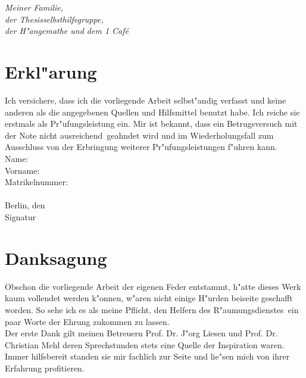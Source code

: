 \documentclass[11pt, twoside]{report} %
\begin{document}


\thispagestyle{empty}
\cleardoublepage
\chapter*{}
\textit{Meiner Familie,\\
der Thesisselbsthilfegruppe,\\
der H"angemathe und dem 1 Caf\'e}

\chapter*{Erkl"arung}
Ich versichere, dass ich die vorliegende Arbeit selbst"andig verfasst und keine anderen als die
angegebenen Quellen und Hilfsmittel benutzt habe. Ich reiche sie erstmals als Pr"ufungsleistung ein.
Mir ist bekannt, dass ein Betrugsversuch mit der Note \glqq nicht ausreichend\grqq \ geahndet wird und im Wiederholungsfall zum Ausschluss
von der Erbringung weiterer Pr"ufungsleistungen f"uhren kann.\\

Name:\\

Vorname:\\

Matrikelnummer:\\

\textcolor{white}{filler}\\

Berlin, den\\

Signatur

\chapter*{Danksagung}
Obschon die vorliegende Arbeit der eigenen Feder entstammt, h"atte dieses Werk kaum vollendet werden k"onnen,
w"aren nicht einige H"urden beiseite geschafft worden.
So sehe ich es als meine Pflicht, den Helfern des \glqq R"aumungsdienstes\grqq\ ein paar Worte der Ehrung
zukommen zu lassen.\\

Der erste Dank gilt meinen Betreuern Prof. Dr. J"org Liesen und Prof. Dr. Christian Mehl deren Sprechstunden
stets eine Quelle der Inspiration waren. Immer hilfsbereit standen sie mir fachlich zur Seite und lie"sen mich von ihrer Erfahrung profitieren.\\
\end{document}
